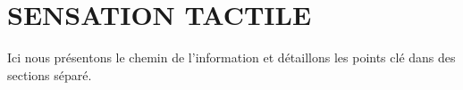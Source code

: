 \chapter{SENSATION TACTILE}
Ici nous présentons le chemin de l’information et détaillons les points clé dans des sections séparé.\par






